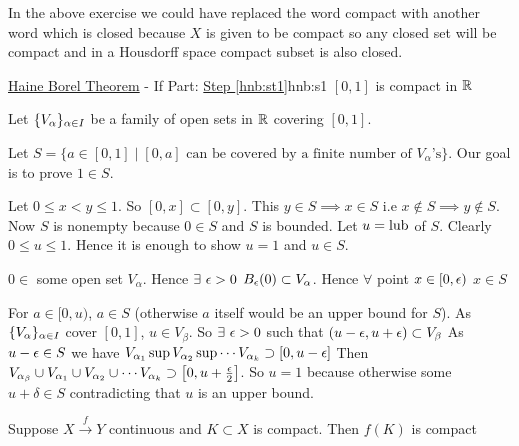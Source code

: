 In the above exercise we could have replaced the word compact with another word which is closed because $X$ is given to be compact so any closed set will be compact and in a Housdorff space compact subset is also closed.


\begin{Theorem}{\hyperref[th:hnb]{Haine Borel Theorem} - If Part: \hyperref[hnb:st1]{Step \ref{hnb:st1}}}{hnb:s1}
	$[0,1]$ is compact in $\mathbb{R}$
\end{Theorem}
\begin{myproof}
	Let $\{V_{\alpha}\}_{\alpha\in I}$ be a family of open sets in $\mathbb{R}$ covering $[0,1]$. 
	
	Let $S=\{a\in [0,1]\mid [0,a]\text{ can be covered by a finite number of }V_{\alpha}\text{'s}\}$. Our goal is to prove $1\in S$.
	
	Let $0\leq x<y\leq 1$. So $[0,x]\subset [0,y]$. This $y\in S\implies x\in S$ i.e $x\notin S\implies y\notin S$. Now $S$ is nonempty because $0\in S$ and $S$ is bounded. Let $u=\text{lub}$ of $S$. Clearly $0\leq u\leq 1$. Hence it is enough to show $u=1$ and $u\in S$. 
	
	$0\in$ some open set $V_{\alpha}$. Hence $\exists\ \epsilon>0$ $B_{\epsilon}(0)\subset V_{\alpha}$. Hence $\forall$ point $x\in [0,\epsilon)$ $x\in S$
	
	For $a\in[0,u)$, $a\in S$ (otherwise $a$ itself would be an upper bound for $S$). As $\{V_{\alpha}\}_{\alpha\in I}$ cover $[0,1]$, $u\in V_{\beta}$. So $\exists \ \epsilon>0$ such that $(u-\epsilon,u+\epsilon)\subset V_{\beta}$ As $u-\epsilon\in S$ we have $V_{\alpha_{1}}\sup V_{\alpha_{2}}\sup\cdots V_{\alpha_{k}}\supset [0,u-\epsilon]$ Then $V_{\alpha_{\beta}}\cup V_{\alpha_{1}}\cup V_{\alpha_{2}}\cup \cdots V_{\alpha_{k}}\supset \left[0,u+\frac{\epsilon}{2}\right]$. So $u=1$ because otherwise some $u+\delta\in S$ contradicting that $u$ is an upper bound. 
\end{myproof}
\begin{Theorem}{}{}
	Suppose $X\xrightarrow{f} Y$ continuous and $K\subset X$ is compact. Then $f(K)$ is compact
\end{Theorem}

